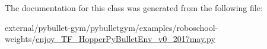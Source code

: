 The documentation for this class was generated from the following file\+:\begin{DoxyCompactItemize}
\item 
external/pybullet-\/gym/pybulletgym/examples/roboschool-\/weights/\hyperlink{enjoy___t_f___hopper_py_bullet_env__v0__2017may_8py}{enjoy\+\_\+\+T\+F\+\_\+\+Hopper\+Py\+Bullet\+Env\+\_\+v0\+\_\+2017may.\+py}\end{DoxyCompactItemize}
